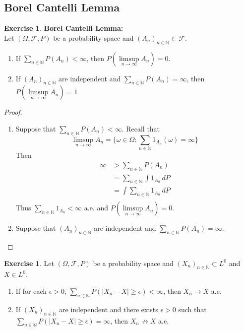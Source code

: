 \documentclass[12pt]{amsart}
\theoremstyle{definition}
\newtheorem{ex}[definition]{Exercise}
\newcommand{\ep}{\epsilon}
\newcommand{\om}{\omega}
\newcommand{\Om}{\Omega}
\newcommand{\N}{\mathbb{N}}
\newcommand{\MF}{\mathcal{F}}
\newcommand{\limpn}{\limsup \limits_{n \rightarrow \infty}}
\newcommand{\dP}{\, d P}
\begin{document}
	
	
	
	
	
	
	
	
	
	
	
	
	
	\newpage
	\subsection{Borel Cantelli Lemma} 
	
	\begin{ex}\textbf{Borel Cantelli Lemma:}\\
		Let $(\Om, \MF, P)$ be a probability space and $(A_n)_{n \in \N} \subset \MF$.
		\begin{enumerate}
			\item If $\sum\limits_{n \in \N}P(A_n) < \infty$, then $P(\limpn A_n) = 0$.
			\item If $(A_n)_{n \in \N}$ are independent and $\sum\limits_{n \in \N} P(A_n) = \infty$, then $P( \limpn A_n) = 1$  
		\end{enumerate}
	\end{ex}
	
	\begin{proof}\
		\begin{enumerate}
			\item Suppose that $\sum\limits_{n \in \N}P(A_n) < \infty$. Recall that $$\limsup\limits_{n \rightarrow \infty}A_n = \bigg \{\om \in \Om: \sum\limits_{n \in \N}1_{A_n}(\om) = \infty \bigg \}$$ Then \begin{align*}
				\infty 
				&> \sum_{n \in \N}P(A_n) \\
				&= \sum_{n \in \N} \int 1_{A_n}\dP \\
				&= \int \sum_{n \in \N} 1_{A_n}\dP \\
			\end{align*}
			Thus $\sum \limits_{n \in \N} 1_{A_n} < \infty$ a.e. and $P(\limpn A_n) = 0$.
			\item Suppose that $(A_n)_{n \in \N}$ are independent and $\sum\limits_{n \in \N} P(A_n) = \infty$.
		\end{enumerate}
	\end{proof}
	
	\begin{ex}
		Let $(\Om, \MF, P)$ be a probability space and $(X_n)_{n \in \N} \subset L^0$ and $X \in L^0$. 
		\begin{enumerate}
			\item If for each $\ep >0 $, $\sum\limits_{n \in \N} P(|X_n -X| \geq \ep) < \infty$, then $X_n \rightarrow X$ a.e.
			\item If $(X_n)_{n \in \N}$ are independent and there exists $\ep >0$ such that $\sum\limits_{n \in \N} P(|X_n -X| \geq \ep) = \infty$, then $X_n \not \rightarrow X$ a.e.
		\end{enumerate}
	\end{ex}
	
\end{document}
